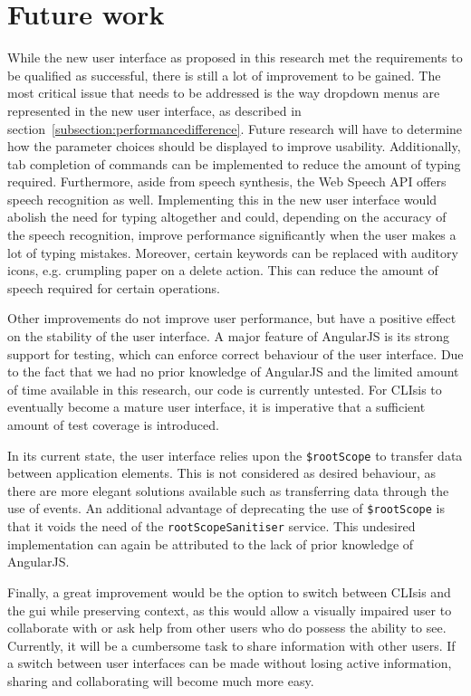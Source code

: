 \section{Future work}
\label{section:futurework}
While the new user interface as proposed in this research met the requirements to be qualified as successful, there is still a lot of improvement to be gained. The most critical issue that needs to be addressed is the way dropdown menus are represented in the new user interface, as described in section~\ref{subsection:performancedifference}. Future research will have to determine how the parameter choices should be displayed to improve usability. Additionally, tab completion of commands can be implemented to reduce the amount of typing required. Furthermore, aside from speech synthesis, the Web Speech API offers speech recognition as well. Implementing this in the new user interface would abolish the need for typing altogether and could, depending on the accuracy of the speech recognition, improve performance significantly when the user makes a lot of typing mistakes. Moreover, certain keywords can be replaced with auditory icons, e.g. crumpling paper on a delete action. This can reduce the amount of speech required for certain operations.

Other improvements do not improve user performance, but have a positive effect on the stability of the user interface. A major feature of AngularJS is its strong support for testing, which can enforce correct behaviour of the user interface. Due to the fact that we had no prior knowledge of AngularJS and the limited amount of time available in this research, our code is currently untested. For CLIsis to eventually become a mature user interface, it is imperative that a sufficient amount of test coverage is introduced.

In its current state, the user interface relies upon the \texttt{\$rootScope} to transfer data between application elements. This is not considered as desired behaviour, as there are more elegant solutions available such as transferring data through the use of events. An additional advantage of deprecating the use of \texttt{\$rootScope} is that it voids the need of the \texttt{rootScopeSanitiser} service. This undesired implementation can again be attributed to the lack of prior knowledge of AngularJS.

Finally, a great improvement would be the option to switch between CLIsis and the \acrshort{gui} while preserving context, as this would allow a visually impaired user to collaborate with or ask help from other users who do possess the ability to see. Currently, it will be a cumbersome task to share information with other users. If a switch between user interfaces can be made without losing active information, sharing and collaborating will become much more easy.

